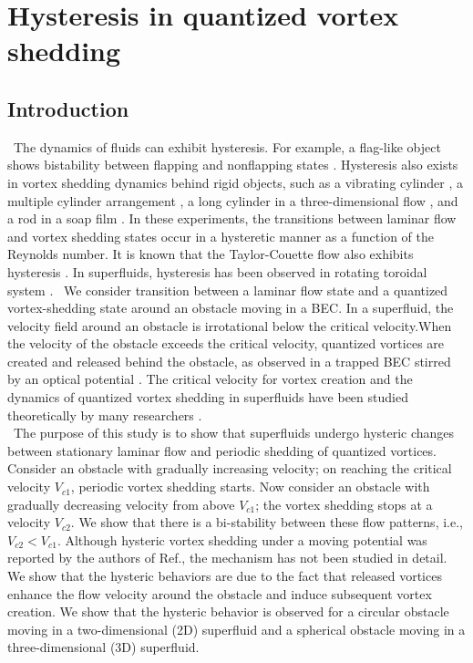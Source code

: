 \documentclass[12pt,a4paper]{report}
\begin{document}
\chapter{Hysteresis in quantized vortex shedding}
\section{Introduction}
\ The dynamics of fluids can exhibit hysteresis. For example,
a flag-like object shows bistability between flapping and 
nonflapping states \cite{36}\cite{37}. Hysteresis also exists
in vortex shedding dynamics behind rigid objects, such
as a vibrating cylinder \cite{38}, a multiple cylinder arrangement \cite{39},
a long cylinder in a three-dimensional flow \cite{40},
and a rod in a soap film \cite{41}. In these experiments, the
transitions between laminar flow and vortex shedding states occur
in a hysteretic manner as a function of the Reynolds number.
It is known that the Taylor-Couette flow also exhibits hysteresis \cite{42}.
In superfluids, hysteresis has been observed in rotating toroidal system \cite{43} \cite{44}.
\ We consider transition between a laminar
flow state and a quantized vortex-shedding state around
an obstacle moving in a BEC. In a superfluid,
the velocity field around an obstacle is irrotational
below the critical velocity.When the velocity of the obstacle
exceeds the critical velocity, quantized vortices are
created and released behind the obstacle, as observed in a trapped BEC
stirred by an optical potential \cite{30} \cite{45} \cite{46}. The critical velocity
for vortex creation and the dynamics of quantized vortex
shedding in superfluids have been studied theoretically by many researchers \cite{19}\cite{21}\cite{22}\cite{24}\cite{31}\cite{33}\cite{35}\cite{47}\cite{48}\cite{49}\cite{50}\cite{51}\cite{52}\cite{53}\cite{54}.
\\
\ The purpose of this study is to show that superfluids
undergo hysteric changes between stationary laminar flow
and periodic shedding of quantized vortices. Consider an
obstacle with gradually increasing velocity; on reaching the
critical velocity $V_{c1}$, periodic vortex shedding starts. Now
consider an obstacle with gradually decreasing velocity from
above $V_{c1}$; the vortex shedding stops at a velocity $V_{c2}$. We
show that there is a bi-stability between these flow patterns,
i.e., $V_{c2} < V_{c1}$. Although hysteric vortex shedding under a
moving potential was reported by the authors of Ref.\cite{33},
the mechanism has not been studied in detail. 
We show that the hysteric behaviors are due to the
fact that released vortices enhance the flow velocity around
the obstacle and induce subsequent vortex creation. We show
that the hysteric behavior is observed for a circular obstacle
moving in a two-dimensional (2D) superfluid and a spherical
obstacle moving in a three-dimensional (3D) superfluid.
\end{document}

